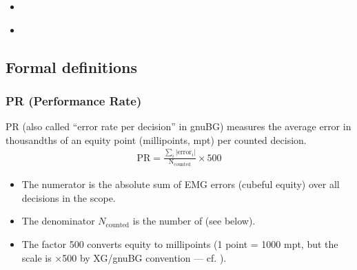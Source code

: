 \documentclass[letterpaper,10pt,english]{sphinxmanual}
\begin{document}
\begin{sphinxcontents}
\begin{itemize}
\begin{itemize}
\item {} 
\sphinxAtStartPar
{}\label{\detokenize{stats_parity:id11}}{\hyperref[\detokenize{stats_parity:comparaison-gnubg-blunderdb-import-sgf-moteurs-differents}]{}}

\end{itemize}

\item {} 
\sphinxAtStartPar
{}\label{\detokenize{stats_parity:id12}}{\hyperref[\detokenize{stats_parity:valider-vos-propres-chiffres}]{}}

\item {} 
\sphinxAtStartPar
{}\label{\detokenize{stats_parity:id13}}{\hyperref[\detokenize{stats_parity:reference-gnubg}]{}}

\end{itemize}
\end{sphinxcontents}


\subsection{Formal definitions}
\label{\detokenize{stats_parity:definitions-formelles}}

\subsubsection{PR (Performance Rate)}
\label{\detokenize{stats_parity:pr-performance-rate}}
\sphinxAtStartPar
PR (also called “error rate per decision” in gnuBG) measures the average error in thousandths of an equity point (millipoints, mpt) per counted decision.
\begin{equation*}
\begin{split}\mathrm{PR} = \frac{\sum_i |\mathrm{error}_i|}{\mathrm{N_{counted}}} \times 500\end{split}
\end{equation*}\begin{itemize}
\item {} 
\sphinxAtStartPar
The numerator is the absolute sum of EMG errors (cubeful equity) over all decisions in the scope.

\item {} 
\sphinxAtStartPar
The denominator \(N_\text{counted}\) is the number of  (see below).

\item {} 
\sphinxAtStartPar
The factor 500 converts equity to millipoints (1 point = 1000 mpt, but the scale is ×500 by XG/gnuBG convention — cf. ).

\end{itemize}
\end{document}
